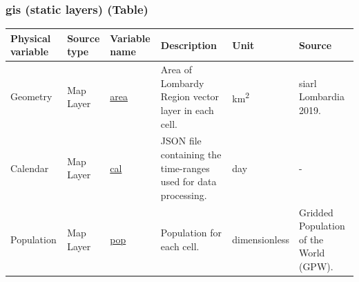 \subsubsection{\acrshort{gis} (static layers) (Table)}
\begin{center}
\setlength{\arrayrulewidth}{1.5pt}
\begin{longtable}{ |p{2.2cm}|p{1.5cm}|p{2.3cm}|p{4cm}|p{2.2cm}|p{2.1cm}| } 
\hline
\textbf{Physical variable} & \textbf{Source type}  & \textbf{Variable name}  & \textbf{Description}  & \textbf{Unit}  & \textbf{Source}\\ 
\hline
\multirow{1}{4em}{Geometry} & Map Layer  & \underline{area} & Area of Lombardy Region vector layer in each cell. \par& km\textsuperscript{2} & \acrshort{siarl} Lombardia 2019.\\ 
\hline
\multirow{1}{4em}{Calendar} & Map Layer  & \underline{cal} & JSON file containing the time-ranges used for data processing. \par& day & -\\ 
\hline

\multirow{1}{4em}{Population} & Map Layer  & \underline{pop} & Population for each cell. & dimensionless& Gridded Population of the World (GPW).\\ \hline


\end{longtable}
\end{center}
